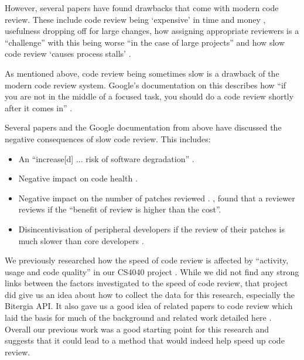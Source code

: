However, several papers have found drawbacks that come with modern code review. These include code review being `expensive' in time and money \citep[p. 27]{7202946}, usefulness dropping off for large changes, how assigning appropriate reviewers is a ``challenge'' with this being worse ``in the case of large projects'' \citep[p. 931]{6606642} and how slow code review `causes process stalls' \citep[p. 28]{7202946}.


As mentioned above, code review being sometimes slow is a drawback of the modern code review system. Google's documentation on this describes how ``if you are not in the middle of a focused task, you should do a code review shortly after it comes in'' \citep{GoogleCodeReviewSpeed}.

Several papers and the Google documentation from above have discussed the negative consequences of slow code review. This includes:
\begin{itemize}
    \item An ``increase[d] ... risk of software degradation'' \citep[p. 519]{9240657}.
    \item Negative impact on code health \citep{GoogleCodeReviewSpeed}.
    \item Negative impact on the number of patches reviewed \citep[p. 67]{7809488}. \citeauthor{7809488}, \citeyear{7809488} found that a reviewer reviews if the ``benefit of review is higher than the cost''.
    \item Disincentivisation of peripheral developers if the review of their patches is much slower than core developers \citep[p. 8]{10.1145/2652524.2652544}.
\end{itemize}

We previously researched how the speed of code review is affected by ``activity, usage and code quality'' in our CS4040 project \citep[p. 1]{WilliamBrownCS4040}. While we did not find any strong links between the factors investigated to the speed of code review, that project did give us an idea about how to collect the data for this research, especially the Bitergia API. %
It also gave us a good idea of related papers to code review which laid the basis for much of the background and related work detailed here \citep[pp. 2-3]{WilliamBrownCS4040}. Overall our previous work was a good starting point for this research and suggests that it could lead to a method that would indeed help speed up code review.

